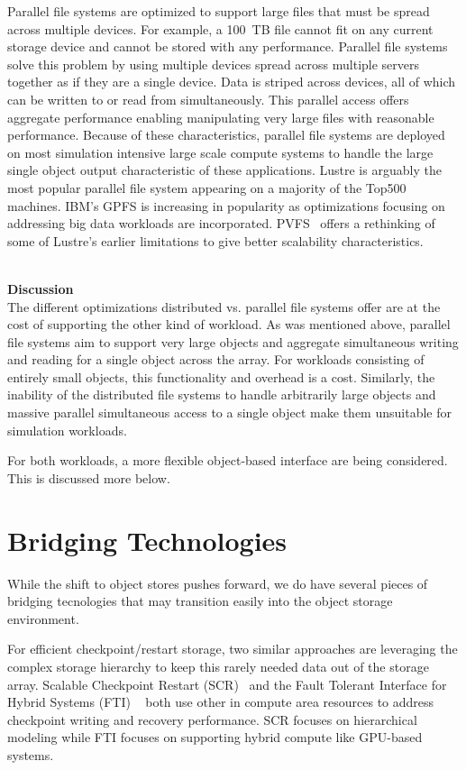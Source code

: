 Parallel file systems are optimized to support large files that must be spread
across multiple devices. For example, a 100~TB file cannot fit on any current
storage device and cannot be stored with any performance. Parallel file systems
solve this problem by using multiple devices spread across multiple servers
together as if they are a single device. Data is striped across devices, all of
which can be written to or read from simultaneously. This parallel access
offers aggregate performance enabling manipulating very large files with
reasonable performance. Because of these characteristics, parallel file systems
are deployed on most simulation intensive large scale compute systems to handle
the large single object output characteristic of these applications.  Lustre is
arguably the most popular parallel file system appearing on a majority of the
Top500 machines. IBM's GPFS is increasing in popularity as optimizations
focusing on addressing big data workloads are incorporated.
PVFS~\cite{ross:2006:pvfs} offers a rethinking of some of Lustre's earlier
limitations to give better scalability characteristics.

~\\\noindent\textbf{Discussion}\\
The different optimizations distributed vs. parallel file systems offer are at
the cost of supporting the other kind of workload. As was mentioned above,
parallel file systems aim to support very large objects and aggregate
simultaneous writing and reading for a single object across the array. For
workloads consisting of entirely small objects, this functionality and overhead
is a cost. Similarly, the inability of the distributed file systems to handle
arbitrarily large objects and massive parallel simultaneous access to a single
object make them unsuitable for simulation workloads.

For both workloads, a more flexible object-based interface are being
considered. This is discussed more below.

\section{Bridging Technologies}

While the shift to object stores pushes forward, we do have several pieces of
bridging tecnologies that may transition easily into the object storage
environment.

For efficient checkpoint/restart storage, two similar approaches are leveraging
the complex storage hierarchy to keep this rarely needed data out of the
storage array. Scalable Checkpoint Restart (SCR)~\cite{moody:2010:scr} and the
Fault Tolerant Interface for Hybrid Systems (FTI) ~\cite{bautista:2011:fti}
both use other in compute area resources to address checkpoint writing and
recovery performance. SCR focuses on hierarchical modeling while FTI focuses on
supporting hybrid compute like GPU-based systems.

